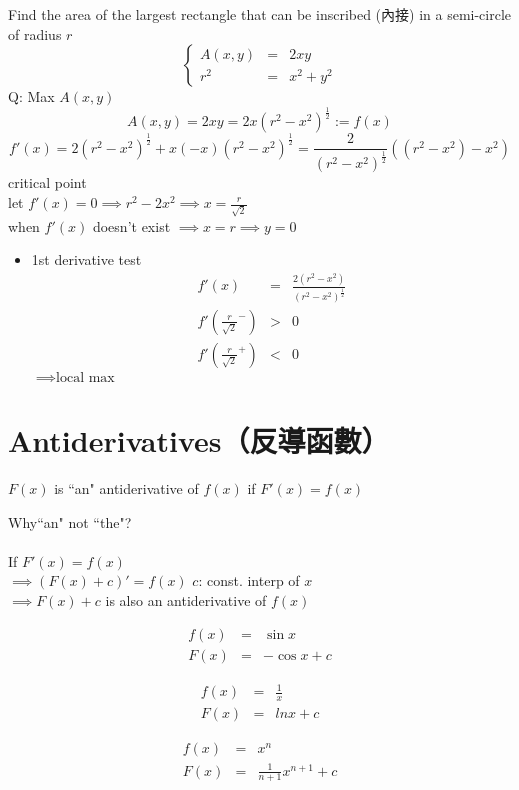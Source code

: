 \begin{eg}
Find the area of the largest rectangle that can be inscribed (內接) in a semi-circle of radius $r$\\
$$\left \{ \begin{array}{rcl}
A(x, y) & = & 2xy\\
r^2 & = & x^2 + y^2
\end{array}\right.$$
Q: Max $A(x,y)$\\
$$A(x,y) = 2xy = 2x(r^2 - x^2)^{\frac{1}{2}} := f(x)$$
$$\displaystyle f'(x) = 2(r^2 - x^2)^{\frac{1}{2}} + x(-x)(r^2-x^2)^{\frac{1}{2}} = \frac{2}{(r^2 - x^2)^{\frac{1}{2}}}((r^2-x^2)-x^2)$$
critical point\\
let $f'(x) = 0 \implies r^2-2x^2 \implies x = \displaystyle  \frac{r}{\sqrt{2}}$\\
when $f'(x)$ doesn't exist $\implies x=r \implies y=0$
\begin{itemize}
\item 1st derivative test
$$\begin{array}{rcl}
f'(x) & = & \displaystyle \frac{2(r^2-x^2)}{(r^2 - x^2)^{\frac{1}{2}}}\\ %
\displaystyle f'(\frac{r}{\sqrt{2}}^-) & > & 0\\
\displaystyle f'(\frac{r}{\sqrt{2}} ^+) & < & 0
\end{array}$$
$\implies \text{local max}$
\end{itemize}
\end{eg}
\section{Antiderivatives（反導函數）}
\begin{defn}
$F(x)$ is ``an" antiderivative of $f(x)$ if $F'(x) = f(x)$
\end{defn}
\begin{notn}
Why``an" not ``the"?\\\\
If $F'(x) = f(x)$\\
$\implies (F(x) + c)' = f(x)$ \quad $c$: const. interp of $x$\\
$\implies F(x) + c$ is also an antiderivative of $f(x)$
\end{notn}
\begin{eg}
$$\begin{array}{rcl}
f(x) & = & \sin x\\
F(x) & = & -\cos x + c
\end{array}$$
\end{eg}
\begin{eg}
$$\begin{array}{rcl}
f(x) & = & \displaystyle \frac{1}{x}\\
F(x) & = & ln x + c
\end{array}$$
\end{eg}
\begin{eg}
$$\begin{array}{rcl}
f(x) & = & x^n\\
F(x) & = & \displaystyle \frac{1}{n+1} x^{n+1} + c
\end{array}$$
\end{eg}
